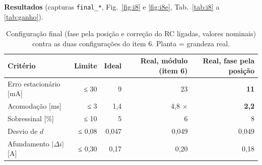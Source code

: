 \documentclass[10pt,a4paper]{article}
\begin{document}
\textbf{Resultados} (capturas \texttt{final\_*}, Fig.~\ref{fig:i8} e \ref{fig:i8e}, Tab.~\ref{tab:i8} a \ref{tab:ganho}).

\begin{table}[!htbp]\centering\footnotesize
\caption{Configuração final (fase pela posição e correção do RC ligadas, valores nominais) contra as duas configurações do item 6. Planta = grandeza real.}\label{tab:fin}
\begin{tabular}{lrrrr}\toprule
Critério & Limite & Ideal & Real, módulo (item 6) & Real, fase pela posição\\\midrule
Erro estacionário [mA] & ≤ 30 & 9 & 23 & \textbf{11}\\
Acomodação [ms] & ≤ 3 & 1,4 & 4,8 $\times$ & \textbf{2,2}\\
Sobressinal [\%] & ≤ 10 & 5 & 6 & 8\\
Desvio de $d$ & ≤ 0,08 & 0,047 & 0,049 & 0,049\\
Afundamento $|\Delta i|$ [A] & ≤ 0,30 & 0,17 & 0,20 & 0,18\\\bottomrule
\end{tabular}
\end{table}
\end{document}
